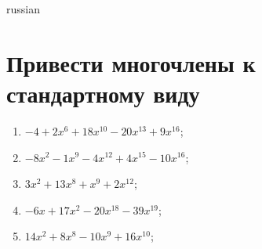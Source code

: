 \documentclass[a4paper]{article}
\begin{document}
\begin{otherlanguage*}{russian}

\section{Привести многочлены к стандартному виду}
\begin{enumerate}
\item $-4 + 2x^6 + 18x^10-20x^13 + 9x^16$;
\item $-8x^2-1x^9-4x^12 + 4x^15-10x^16$;
\item $3x^2 + 13x^8 + x^9 + 2x^12$;
\item $-6x + 17x^2-20x^18-39x^19$;
\item $14x^2 + 8x^8-10x^9 + 16x^10$;
\end{enumerate}
\end{otherlanguage*}
\end{document}
